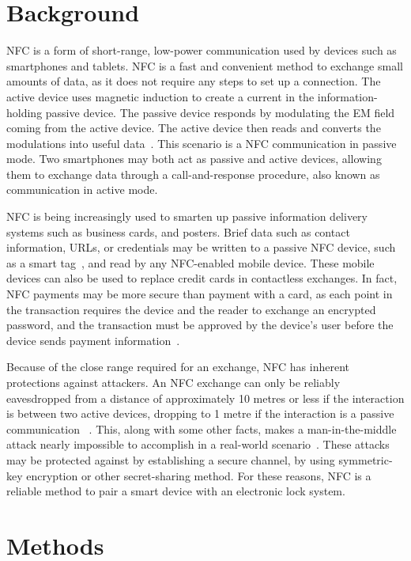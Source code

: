 \documentclass{article}
\begin{document}
\section{Background}

NFC is a form of short-range, low-power communication used by devices such as smartphones and tablets. NFC is a fast
and convenient method to exchange small amounts of data, as it does not require any steps to set up a connection. The 
active device uses magnetic induction to create a current in the information-holding passive device. The
passive device responds by modulating the EM field coming from the active device. The active device then reads and
converts the modulations into useful data~\autocite{NFCORG}. This scenario is a NFC communication in passive mode. Two
smartphones may both act as passive and active devices, allowing them to exchange data through a call-and-response procedure,
also known as communication in active mode.

NFC is being increasingly used to smarten up passive information delivery systems such as business cards, and posters.
Brief data such as contact information, URLs, or credentials may be written to a passive NFC device, such as a smart
tag~\autocite{NFCFORUMWHATIS}, and read by any NFC-enabled mobile device. These mobile devices can also be used to
replace credit cards in contactless exchanges. In fact, NFC payments may be more secure than payment with a card, as
each point in the transaction requires the device and the reader to exchange an encrypted password, and the transaction
 must be approved by the device's user before the device sends payment information~\autocite{NFCPAYMENT}.

Because of the close range required for an exchange, NFC has inherent protections against attackers. An NFC exchange
can only be reliably eavesdropped from a distance of approximately 10 metres or less if the interaction is between two 
active devices, dropping to 1 metre if the interaction is a passive communication ~\autocite{NFCSECURITY}. This, along 
with some other facts, makes a man-in-the-middle attack nearly impossible to accomplish in a real-world 
scenario~\autocite{NFCSECURITY}. These attacks may be protected against by establishing a secure channel, by using 
symmetric-key encryption or other secret-sharing method. For these reasons, NFC is a reliable method to pair a smart 
device with an electronic lock system.

\section{Methods}
\end{document}
